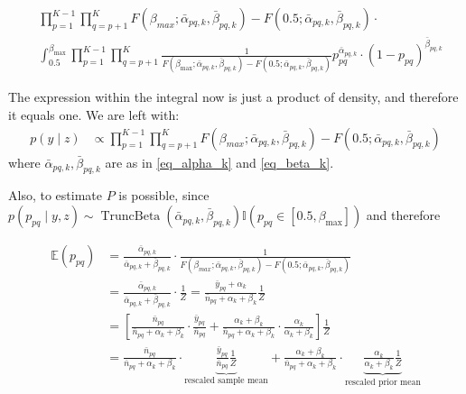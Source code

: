 \documentclass[11pt]{amsart}
\begin{document}
\begin{align}
& \prod_{p=1}^{K-1}\prod_{q= p+1}^{K}  F(\beta_{max};\bar{\alpha}_{pq,k},\bar{\beta}_{pq,k}) - F(0.5;\bar{\alpha}_{pq,k},\bar{\beta}_{pq,k})  \cdot 
   \nonumber \\ 
 &\int_{0.5}^{\beta_{\max}} \prod_{p=1}^{K-1}\prod_{q= p+1}^{K} \frac{1}{F(\beta_{\max};\bar{\alpha}_{pq,k},\bar{\beta}_{pq,k}) - F(0.5;\bar{\alpha}_{pq,k},\bar{\beta}_{pq,k}) }
 p_{pq}^{\bar{\alpha}_{pq,k}} \cdot\left(1-p_{pq}\right)^{\bar{\beta}_{pq,k}} 
\end{align}

The expression within the integral now is just a product of density, and therefore it equals one. We are left with:
\begin{align}
p \left(y \mid z \right) &\propto \prod_{p=1}^{K-1}\prod_{q= p+1}^{K}  F(\beta_{max};\bar{\alpha}_{pq,k},\bar{\beta}_{pq,k}) - F(0.5;\bar{\alpha}_{pq,k},\bar{\beta}_{pq,k}) 
\end{align}
where $\bar{\alpha}_{pq,k},\bar{\beta}_{pq,k}$ are as in \eqref{eq_alpha_k} and \eqref{eq_beta_k}.

Also, to estimate $P$ is possible, since $p\left(p_{pq} \mid y,z\right) \sim \operatorname{TruncBeta}\left(\bar{\alpha}_{pq,k},\bar{\beta}_{pq,k}\right) \mathbb{I}\left(p_{pq} \in \left[0.5,\beta_{\max}\right]\right)$ and therefore 

\begin{align}
\mathbb{E}\left(p_{pq}\right) &= \frac{\bar{\alpha}_{pq,k}}{\bar{\alpha}_{pq,k}+\bar{\beta}_{pq,k}} \cdot \frac{1}{F(\beta_{max};\bar{\alpha}_{pq,k},\bar{\beta}_{pq,k}) - F(0.5;\bar{\alpha}_{pq,k},\bar{\beta}_{pq,k})} \nonumber \\
&= \frac{\bar{\alpha}_{pq,k}}{\bar{\alpha}_{pq,k}+\bar{\beta}_{pq,k}} \cdot \frac{1}{Z} = \frac{\bar{y}_{pq}+\alpha_k}{\bar{n}_{pq}+ \alpha_k +\beta_k} \frac{1}{Z} \nonumber \\
&= \left[ \frac{\bar{n}_{pq}}{\bar{n}_{pq}+ \alpha_k +\beta_k} \cdot \frac{\bar{y}_{pq}}{\bar{n}_{pq}} + \frac{\alpha_k +\beta_k}{\bar{n}_{pq}+ \alpha_k +\beta_k} \cdot \frac{\alpha_k}{\alpha_k +\beta_k} \right ] \frac{1}{Z} \nonumber \\
&= \frac{\bar{n}_{pq}}{\bar{n}_{pq}+ \alpha_k +\beta_k} \cdot \underbrace{\frac{\bar{y}_{pq}}{\bar{n}_{pq}} \frac{1}{Z}}_\text{rescaled sample mean}
+ \frac{\alpha_k +\beta_k}{\bar{n}_{pq}+ \alpha_k +\beta_k} \cdot \underbrace{\frac{\alpha_k}{\alpha_k +\beta_k}\frac{1}{Z}}_\text{rescaled prior mean}
 \end{align}
\end{document}
